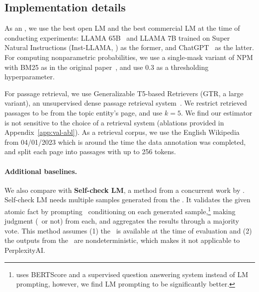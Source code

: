\subsection{Implementation details}\label{subsubsec:setup-validation}

As an \evalLM, we use the best open LM and the best commercial LM at the time of conducting experiments: LLAMA 65B~\citep{touvron2023llama} and LLAMA 7B trained on Super Natural Instructions (Inst-LLAMA, \citealp{wang2022super}) as the former, and ChatGPT~\citep{chatgpt} as the latter. %
For computing nonparametric probabilities, we use a single-mask variant of NPM with BM25 as in the original paper~\citep{min2022nonparametric}, and use $0.3$ as a thresholding hyperparameter.

For passage retrieval, we use Generalizable T5-based Retrievers (GTR, a large variant), an unsupervised dense passage retrieval system~\citep{ni2021large}. We restrict retrieved passages to be from the topic entity's page, and use $k=5$.
We find our estimator is not sensitive to the choice of a retrieval system (ablations provided in Appendix~\ref{app:val-abl}). %
As a retrieval corpus, we use the English Wikipedia from 04/01/2023 which is around the time the data annotation was completed, and split each page into passages with up to 256 tokens.


\paragraph{Additional baselines.} We also compare with \textbf{Self-check LM}, a method from a concurrent work by \citet{manakul2023selfcheckgpt}. Self-check LM needs multiple samples generated from the \subjectLM. It validates the given atomic fact by prompting \evalLM\ conditioning on each generated sample,\footnote{\citet{manakul2023selfcheckgpt} uses BERTScore and a supervised question answering system instead of LM prompting, however, we find LM prompting to be significantly better.}  making judgment (\sLabel\ or not) from each, and aggregates the results through a majority vote.
This method assumes (1) the \subjectLM\ is available at the time of evaluation and (2) the outputs from the \subjectLM\ are nondeterministic, which makes it not applicable to PerplexityAI.


